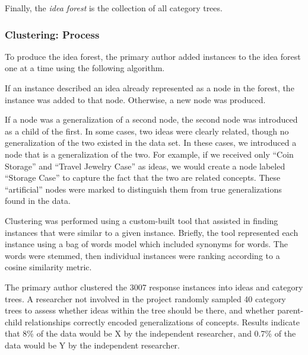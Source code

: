 Finally, the \emph{idea forest} is the collection of all category trees.

\subsubsection{Clustering: Process}
To produce the idea forest, the primary author added instances to the idea forest one at a time using the following algorithm.

If an instance described an idea already represented as a node in the forest, the instance was added to that node. Otherwise, a new node was produced.

If a node was a generalization of a second node, the second node was introduced as a child of the first. In some cases, two ideas were clearly related, though no generalization of the two existed in the data set. In these cases, we introduced a node that is a generalization of the two. For example, if we received only ``Coin Storage'' and ``Travel Jewelry Case'' as ideas, we would create a node labeled ``Storage Case'' to capture the fact that the two are related concepts. These ``artificial'' nodes were marked to distinguish them from true generalizations found in the data.

Clustering was performed using a custom-built tool that assisted in finding instances that were similar to a given instance. Briefly, the tool represented each instance using a bag of words model which included synonyms for words. The words were stemmed, then individual instances were ranking according to a cosine similarity metric.

The primary author clustered the 3007 response instances into ideas and category trees. A researcher not involved in the project randomly sampled 40 category trees to assess whether ideas within the tree should be there, and whether parent-child relationships correctly encoded generalizations of concepts. Results indicate that 8\% of the data would be X by the independent researcher, and 0.7\% of the data would be Y by the independent researcher.




